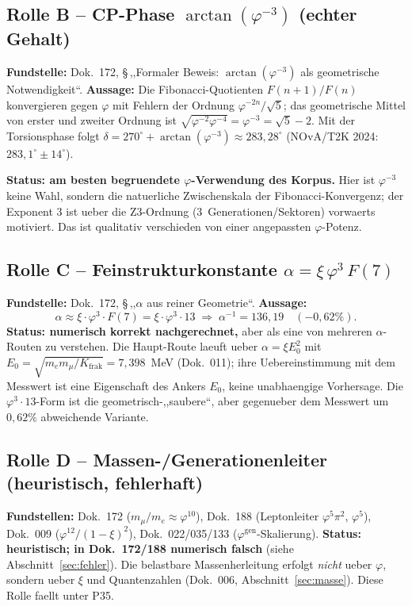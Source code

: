 \subsection{Rolle B -- CP-Phase $\arctan(\varphi^{-3})$ (echter Gehalt)}
\textbf{Fundstelle:} Dok.~172, \S\,,,Formaler Beweis: $\arctan(\varphi^{-3})$
als geometrische Notwendigkeit``. \textbf{Aussage:} Die Fibonacci-Quotienten
$F(n{+}1)/F(n)$ konvergieren gegen $\varphi$ mit Fehlern der Ordnung
$\varphi^{-2n}/\sqrt5$; das geometrische Mittel von erster und zweiter Ordnung
ist $\sqrt{\varphi^{-2}\varphi^{-4}}=\varphi^{-3}=\sqrt5-2$. Mit der
Torsionsphase folgt
$\delta = 270^\circ + \arctan(\varphi^{-3}) \approx 283{,}28^\circ$
(NOvA/T2K 2024: $283{,}1^\circ\pm14^\circ$).
\begin{correct}
\textbf{Status: am besten begruendete $\varphi$-Verwendung des Korpus.} Hier
ist $\varphi^{-3}$ keine Wahl, sondern die natuerliche Zwischenskala der
Fibonacci-Konvergenz; der Exponent $3$ ist ueber die Z3-Ordnung
($3$~Generationen/Sektoren) vorwaerts motiviert. Das ist qualitativ
verschieden von einer angepassten $\varphi$-Potenz.
\end{correct}

\subsection{Rolle C -- Feinstrukturkonstante $\alpha=\xi\,\varphi^3\,F(7)$}
\textbf{Fundstelle:} Dok.~172, \S\,,,$\alpha$ aus reiner Geometrie``.
\textbf{Aussage:}
\begin{equation}
  \alpha \approx \xi\cdot\varphi^3\cdot F(7) = \xi\cdot\varphi^3\cdot 13
  \;\Rightarrow\; \alpha^{-1} = 136{,}19 \quad(-0{,}62\%).
\end{equation}
\textbf{Status: numerisch korrekt nachgerechnet,} aber als eine von mehreren
$\alpha$-Routen zu verstehen. Die Haupt-Route laeuft ueber
$\alpha=\xi E_0^2$ mit $E_0=\sqrt{m_e m_\mu/K_{\text{frak}}}=7{,}398$~MeV (Dok.~011); ihre Uebereinstimmung mit dem Messwert ist eine Eigenschaft des Ankers $E_0$, keine unabhaengige Vorhersage. Die $\varphi^3\cdot13$-Form ist die
geometrisch-,,saubere``, aber gegenueber dem Messwert um $0{,}62\%$ abweichende
Variante.

\subsection{Rolle D -- Massen-/Generationenleiter (heuristisch, fehlerhaft)}
\textbf{Fundstellen:} Dok.~172 ($m_\mu/m_e\approx\varphi^{10}$),
Dok.~188 (Leptonleiter $\varphi^5\pi^2$, $\varphi^5$), Dok.~009
($\varphi^{12}/(1-\xi)^2$), Dok.~022/035/133 ($\varphi^{\text{gen}}$-Skalierung).
\textbf{Status: heuristisch; in Dok.~172/188 numerisch falsch} (siehe
Abschnitt~\ref{sec:fehler}). Die belastbare Massenherleitung erfolgt
\emph{nicht} ueber $\varphi$, sondern ueber $\xi$ und Quantenzahlen (Dok.~006,
Abschnitt~\ref{sec:masse}). Diese Rolle faellt unter P35.

